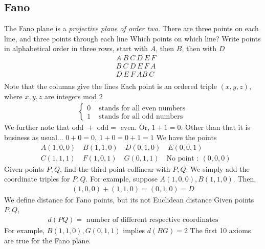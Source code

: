 \documentclass{report}
\begin{document}
    \subsection{Fano}
    \bigbreak \noindent 
    The Fano plane is a \textit{projective plane of order two.}
    \bigbreak \noindent 
    There are three points on each line, and three points through each line
    \bigbreak \noindent 
    Which points on which line? Write points in alphabetical order in three rows, start with $A$, then $B$, then with $D$
    \begin{align*}
            &A \ B \ C \ D \ E \ F \\
            &B \ C \ D \ E \ F \ A\\
            &D \ E \ F \ A B \ C \ \\
    \end{align*}
    Note that the columns give the lines
    \bigbreak \noindent 
    Each point is an ordered triple $(x,y,z) $, where $x,y,z$ are integers mod $2$
    \bigbreak \noindent 
    \begin{align*}
        \begin{cases}
            0 & \text{ stands for all even numbers}     \\
            1 & \text{ stands for all odd numbers}     
        \end{cases}
    \end{align*}
    We further note that $\text{odd } + \text{ odd} = \text{ even}$. Or, $1 +1 = 0 $. Other than that it is business as usual... $0+0 =0,\ 1+0 = 0 + 1 =  1$
    \bigbreak \noindent 
    We have the points
    \begin{align*}
            &A(1,0,0) \quad B(1,1,0) \quad D(0,1,0) \quad E(0,0,1) \\
            &C(1,1,1) \quad F(1,0,1) \quad G(0,1,1) \quad \text{No point }:\ (0,0,0)
    \end{align*}
    \bigbreak \noindent 
    Given points $P,Q$, find the third point collinear with $P,Q$. We simply add the coordinate triples for $P,Q$. For example, suppose $A(1,0,0), B(1,1,0)$. Then,
    \begin{align*}
        (1,0,0) + (1,1,0) = (0,1,0) = D
    \end{align*}
    \bigbreak \noindent 
    We define distance for Fano points, but its not Euclidean distance
    \bigbreak \noindent 
    Given points $P,Q$,
    \begin{align*}
        d(PQ) = \text{ number of different respective coordinates}
    \end{align*}
    \bigbreak \noindent 
    For example, $B(1,1,0), G(0,1,1)$ implies $d(BG) = 2 $
    \bigbreak \noindent 
    The first 10 axioms are true for the Fano plane.
\end{document}
